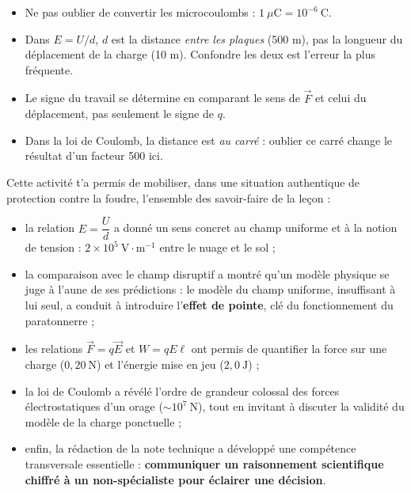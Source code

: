 \documentclass[11pt]{article}
\newcounter{popsec}
\newcounter{popsub}
\newcommand{\courssub}[1]{%
  \stepcounter{popsub}%
  \par\vspace{9pt}\noindent{\popxbold\fontsize{11.5}{13}\selectfont\color{popink}{\color{poporange}\thepopsec.\thepopsub}\hspace{6pt}#1}\par\nopagebreak\vspace{4pt}
}
\begin{document}
\begin{attention}
\begin{itemize}
\item Ne pas oublier de convertir les microcoulombs : $1~\mu\text{C} = 10^{-6}~\text{C}$.
\item Dans $E = U/d$, $d$ est la distance \emph{entre les plaques} (500 m), pas la longueur du déplacement de la charge (10 m). Confondre les deux est l'erreur la plus fréquente.
\item Le signe du travail se détermine en comparant le sens de $\vec{F}$ et celui du déplacement, pas seulement le signe de $q$.
\item Dans la loi de Coulomb, la distance est \emph{au carré} : oublier ce carré change le résultat d'un facteur 500 ici.
\end{itemize}
\end{attention}

\courssub{Bilan de l'activité}

Cette activité t'a permis de mobiliser, dans une situation authentique de protection contre la foudre, l'ensemble des savoir-faire de la leçon :

\begin{itemize}
\item la relation $E = \dfrac{U}{d}$ a donné un sens concret au champ uniforme et à la notion de tension : $2\times 10^{5}~\text{V}\cdot\text{m}^{-1}$ entre le nuage et le sol ;
\item la comparaison avec le champ disruptif a montré qu'un modèle physique se juge à l'aune de ses prédictions : le modèle du champ uniforme, insuffisant à lui seul, a conduit à introduire l'\textbf{effet de pointe}, clé du fonctionnement du paratonnerre ;
\item les relations $\vec{F} = q\vec{E}$ et $W = qE\ell$ ont permis de quantifier la force sur une charge ($0{,}20~\text{N}$) et l'énergie mise en jeu ($2{,}0~\text{J}$) ;
\item la loi de Coulomb a révélé l'ordre de grandeur colossal des forces électrostatiques d'un orage ($\sim 10^{7}~\text{N}$), tout en invitant à discuter la validité du modèle de la charge ponctuelle ;
\item enfin, la rédaction de la note technique a développé une compétence transversale essentielle : \textbf{communiquer un raisonnement scientifique chiffré à un non-spécialiste pour éclairer une décision}.
\end{itemize}
\end{document}
